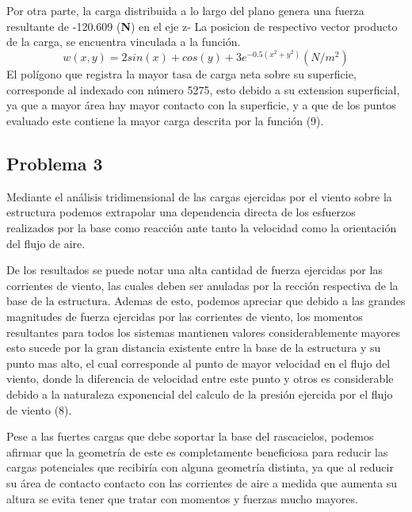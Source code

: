 \documentclass[]{article}
\begin{document}
Por otra parte, la carga distribuida a lo largo del plano genera una fuerza resultante de -120.609 (\textbf{N}) en el eje z- La posicion de respectivo vector producto de la carga, se encuentra vinculada a la función.
\begin{equation}
	w(x, y) = 2sin(x) + cos(y) + 3e^{-0.5(x^2+y^2)} (N/m^2)
\end{equation}
El polígono que registra la mayor tasa de carga neta sobre su superficie, corresponde al indexado con número 5275, esto debido a su extension superficial, ya que a mayor área hay mayor contacto con la superficie, y a que de los puntos evaluado este contiene la mayor carga descrita por la función (9).

\subsection{Problema 3}
Mediante el análisis tridimensional de las cargas ejercidas por el viento sobre la estructura podemos extrapolar una dependencia directa de los esfuerzos realizados por la base como reacción ante tanto la velocidad como la orientación del flujo de aire.

De los resultados se puede notar una alta cantidad de fuerza ejercidas por las corrientes de viento, las cuales deben ser anuladas por la rección respectiva de la base de la estructura. Ademas de esto, podemos apreciar que debido a las grandes magnitudes de fuerza ejercidas por las corrientes de viento, los momentos resultantes para todos los sistemas mantienen valores considerablemente mayores esto sucede por la gran distancia existente entre la base de la estructura y su punto mas alto, el cual corresponde al punto de mayor velocidad en el flujo del viento, donde la diferencia de velocidad entre este punto y otros es considerable debido a la naturaleza exponencial del calculo de la presión ejercida por el flujo de viento (8).

Pese a las fuertes cargas que debe soportar la base del rascacielos, podemos afirmar que la geometría de este es completamente beneficiosa para reducir las cargas potenciales que recibiría con alguna geometría distinta, ya que al reducir su área de contacto contacto con las corrientes de aire a medida que aumenta su altura se evita tener que tratar con momentos y fuerzas mucho mayores.
\end{document}

